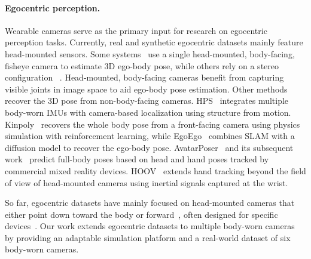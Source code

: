 
\paragraph{Egocentric perception.}
Wearable cameras serve as the primary input for research on egocentric perception tasks.
Currently, real and synthetic egocentric datasets mainly feature head-mounted sensors.
Some systems~\cite{xu2019mo, wangSceneAwareEgocentric3D2023jun, tome2019xr} use a single head-mounted, body-facing, fisheye camera to estimate 3D ego-body pose, while others rely on a stereo configuration ~\cite{rhodin2016egocap, zhao2021egoglass, akada2022unrealego}. 
Head-mounted, body-facing cameras benefit from capturing visible joints in image space to aid ego-body pose estimation.
Other methods recover the 3D pose from non-body-facing cameras. HPS~\cite{guzov2021human} integrates multiple body-worn IMUs with camera-based localization using structure from motion. 
Kinpoly~\cite{luoDynamicsRegulatedKinematicPolicy2022oct} recovers the whole body pose from a front-facing camera using physics simulation with reinforcement learning, while EgoEgo~\cite{liEgoBodyPoseEstimation2023aug} combines SLAM with a diffusion model to recover the ego-body pose.
AvatarPoser~\cite{jiang2022avatarposer} and its subsequent work~\cite{jiang2024egoposer, jiang2024manikin} predict full-body poses based on head and hand poses tracked by commercial mixed reality devices.
HOOV~\cite{streli2023hoov} extends hand tracking beyond the field of view of head-mounted cameras using inertial signals captured at the wrist.

So far, egocentric datasets have mainly focused on head-mounted cameras that either point down toward the body \cite{akada2022unrealego, wangSceneAwareEgocentric3D2023jun, xuMo2Cap2RealtimeMobile2019jan} or forward~\cite{liEgoBodyPoseEstimation2023aug, guzovHumanPOSEitioningSystem2021juna,  yuanEgoPoseEstimationForecasting2019aug}, often designed for specific devices~\cite{khirodkar2023egohumans, graumanEgoExo4DUnderstandingSkilled2024apr, zhang2022egobody, zhaoEgoBody3MEgocentricBody2024}.
Our work extends egocentric datasets to multiple body-worn cameras by providing an adaptable simulation platform and a real-world dataset of six body-worn cameras.

